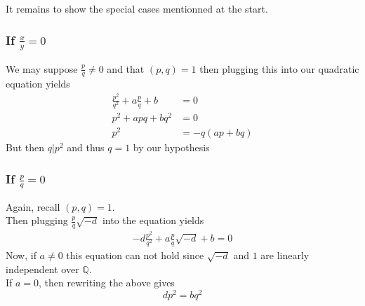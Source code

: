 \documentclass[11pt, a4paper]{article}
\begin{document}

It remains to show the special cases mentionned at the start.
\subsubsection*{If $\frac{x}{y}=0$ }
We may suppose $ \frac{p}{q}\neq 0 $ and that $( p,q) =1$  then plugging this into our quadratic equation yields
\begin{align*}
	\frac{p^{2}}{q^{2}}+ a \frac{p}{q}+b &=0\\
	p^{2} + a p q +b q^{2} &= 0\\
 	p^{2} &= - q ( ap +bq) 
\end{align*}
But then $q | p^{2}$ and thus $q=1$ by our hypothesis
\subsubsection*{If $ \frac{p}{q}= 0$ }
Again, recall $( p,q) =1$.\\
Then plugging $ \frac{p}{q} \sqrt{-d} $ into the equation yields
\begin{align*}
-d\frac{p^{2}}{q^{2}} + a \frac{p}{q} \sqrt{-d}  + b =0
\end{align*}
Now, if $a\neq 0$ this equation can not hold since $ \sqrt{-d} $ and $1$ are linearly independent over $ \mathbb{Q}$.\\
If $a =0$, then rewriting the above gives
\[ 
 d p^{2} = bq^{2}
\]
\end{document}
